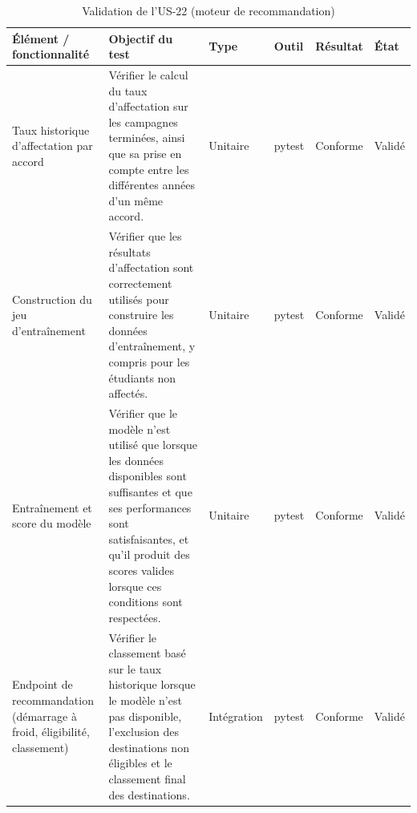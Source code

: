 \begin{table}[H]

\centering

\caption{Validation de l'US-22 (moteur de recommandation)}

\label{tab:validation-sprint6-us22}

\footnotesize

\begin{tabular}{|p{2.7cm}|p{5cm}|p{1.5cm}|p{1.3cm}|p{1.7cm}|p{1.3cm}|}

\hline

\rowcolor{gray!20}

\textbf{Élément / fonctionnalité} &
\textbf{Objectif du test} &
\textbf{Type} &
\textbf{Outil} &
\textbf{Résultat} &
\textbf{État} \\

\hline

Taux historique d'affectation par accord &

Vérifier le calcul du taux d'affectation sur les campagnes terminées,
ainsi que sa prise en compte entre les différentes années d'un même accord. &

Unitaire & pytest & Conforme & Validé \\

\hline

Construction du jeu d'entraînement &

Vérifier que les résultats d'affectation sont correctement utilisés
pour construire les données d'entraînement, y compris pour les étudiants
non affectés. &

Unitaire & pytest & Conforme & Validé \\

\hline

Entraînement et score du modèle &

Vérifier que le modèle n'est utilisé que lorsque les données disponibles
sont suffisantes et que ses performances sont satisfaisantes, et qu'il
produit des scores valides lorsque ces conditions sont respectées. &

Unitaire & pytest & Conforme & Validé \\

\hline

Endpoint de recommandation
(démarrage à froid, éligibilité, classement) &

Vérifier le classement basé sur le taux historique lorsque le modèle
n'est pas disponible, l'exclusion des destinations non éligibles et
le classement final des destinations. &

Intégration & pytest & Conforme & Validé \\

\hline

\end{tabular}

\end{table}

